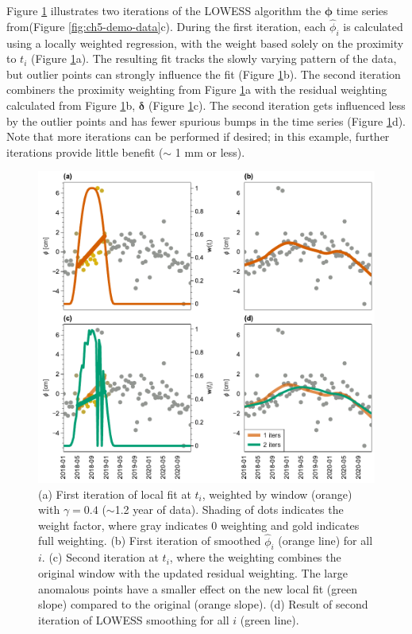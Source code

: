 Figure \ref{fig:ch5-algo-demo} illustrates two iterations of the LOWESS algorithm the $ \bm{\phi} $ time series from(Figure \ref{fig:ch5-demo-data}c).
During the first iteration, each $ \hat{\phi}_i $ is calculated using a locally weighted regression, with the weight based solely on the proximity to $ t_i $ (Figure \ref{fig:ch5-algo-demo}a). The resulting fit tracks the slowly varying pattern of the data, but outlier points can strongly influence the fit (Figure \ref{fig:ch5-algo-demo}b). 
The second iteration combiners the proximity weighting from Figure \ref{fig:ch5-algo-demo}a with the residual weighting calculated from Figure \ref{fig:ch5-algo-demo}b, $ \bm{\delta} $ (Figure \ref{fig:ch5-algo-demo}c).
The second iteration gets influenced less by the outlier points and has fewer spurious bumps in the time series (Figure \ref{fig:ch5-algo-demo}d). Note that more iterations can be performed if desired; in this example, further iterations provide little benefit ($ \sim $ 1 mm or less).


\begin{figure}
	\centering
	\includegraphics[width=.99\textwidth]{figures/chapter5-lowess/figure3-fits.pdf}
	\caption[Demo of LOWESS fitting]{
		(a) First iteration of local fit at $t_i$, weighted by window (orange) with $ \gamma=0.4 $ ($ \sim $1.2 year of data). Shading of dots indicates the weight factor, where gray indicates 0 weighting and gold indicates full weighting.
		(b) First iteration of smoothed $ \hat{\phi}_i $ (orange line) for all $i$. 
		(c) Second iteration at $t_i$, where the weighting combines the original window with the updated residual weighting. The large anomalous points have a smaller effect on the new local fit (green slope) compared to the original (orange slope).
		(d) Result of second iteration of LOWESS smoothing for all $i$ (green line).
	}
	\label{fig:ch5-algo-demo}
\end{figure}

